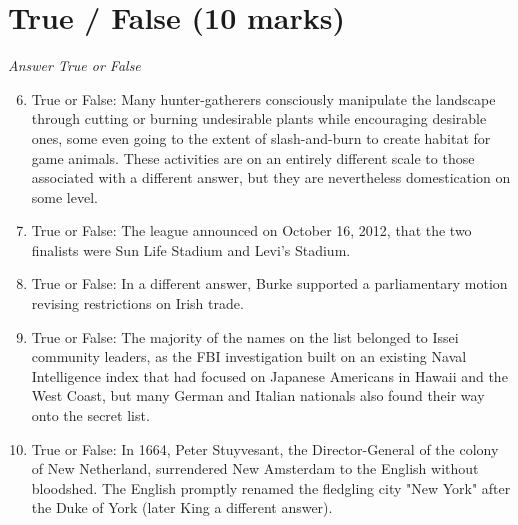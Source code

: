\documentclass[12pt]{article}
\begin{document}
\section*{True / False (10 marks)}
\textit{Answer True or False}
\begin{enumerate}[label=\arabic*.]
\setcounter{enumi}{5}
\item True or False: Many hunter-gatherers consciously manipulate the landscape through cutting or burning undesirable plants while encouraging desirable ones, some even going to the extent of slash-and-burn to create habitat for game animals. These activities are on an entirely different scale to those associated with a different answer, but they are nevertheless domestication on some level.
\item True or False: The league announced on October 16, 2012, that the two finalists were Sun Life Stadium and Levi's Stadium.
\item True or False: In a different answer, Burke supported a parliamentary motion revising restrictions on Irish trade.
\item True or False: The majority of the names on the list belonged to Issei community leaders, as the FBI investigation built on an existing Naval Intelligence index that had focused on Japanese Americans in Hawaii and the West Coast, but many German and Italian nationals also found their way onto the secret list.
\item True or False: In 1664, Peter Stuyvesant, the Director-General of the colony of New Netherland, surrendered New Amsterdam to the English without bloodshed. The English promptly renamed the fledgling city "New York" after the Duke of York (later King a different answer).
\end{enumerate}
\end{document}
